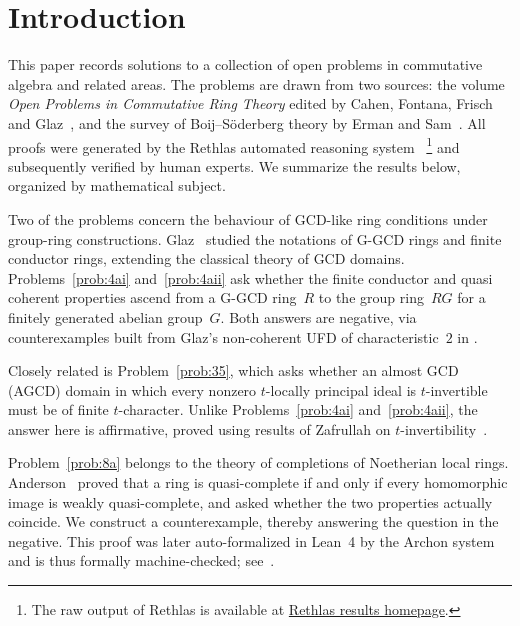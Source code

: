 \documentclass[11pt,reqno]{amsart}
\numberwithin{equation}{section}
\theoremstyle{definition}
\begin{document}
\maketitle

\tableofcontents

\section{Introduction}

This paper records solutions to a collection of open problems in
commutative algebra and related areas. The problems are drawn from two
sources: the volume \emph{Open Problems in Commutative Ring Theory}
edited by Cahen, Fontana, Frisch and Glaz~\cite{CFFG2014}, and the
survey of Boij--S\"oderberg theory by Erman and
Sam~\cite{ErmanSam2017}. All proofs were generated by the Rethlas
automated reasoning system~\cite{JuEtAl2026Rethlas}
\footnote{The raw output of Rethlas is available at
\href{https://github.com/frenzymath/Rethlas_results/tree/main/analysis/Brezis_OpenProblems}{Rethlas results homepage}.} 
and subsequently
verified by human experts. We summarize the results below, organized
by mathematical subject.

Two of the problems concern the behaviour of GCD-like ring conditions
under group-ring constructions.
Glaz~\cite{Glaz2000-FCRZD,Glaz2000-FCR} studied the notations of
G-GCD rings and finite conductor rings, extending the classical theory of GCD domains.
Problems~\ref{prob:4ai} and~\ref{prob:4aii} ask whether the finite
conductor and quasi coherent properties ascend from a G-GCD ring~$R$ to
the group ring~$RG$ for a finitely generated abelian group~$G$. Both
answers are negative, via counterexamples built from Glaz's non-coherent
UFD of characteristic~$2$ in \cite{Glaz2000-FCRZD}.

Closely related is Problem~\ref{prob:35}, which asks whether an
almost GCD (AGCD) domain in which every nonzero $t$-locally principal
ideal is $t$-invertible must be of finite $t$-character. Unlike
Problems~\ref{prob:4ai} and~\ref{prob:4aii}, the answer here
is affirmative, proved using results of Zafrullah on
$t$-invertibility~\cite{Zafrullah-UniversalRestriction,Zafrullah-BazzoniLike}.

Problem~\ref{prob:8a} belongs to the theory of completions of Noetherian local rings.
Anderson~\cite{Anderson2014-QCRM} proved that a ring is quasi-complete if and only if
every homomorphic image is weakly quasi-complete, and asked whether the two properties
actually coincide. We construct a counterexample, thereby answering the question in the
negative. This proof was later auto-formalized in Lean~4 by the Archon system and is
thus formally machine-checked; see~\cite{JuEtAl2026Rethlas}.
\end{document}
